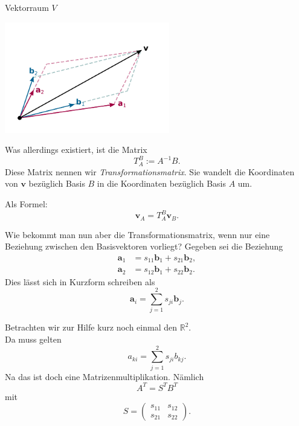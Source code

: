 \documentclass[9pt]{beamer}
\newcommand{\bv}[1]{\mathbf{#1}}
\newcommand{\R}{\mathbb R}
\begin{document}
\begin{frame}
\begin{center}Vektorraum $V$\end{center}

\vspace{-2em}
\begin{center}
\includegraphics[width=72mm]{img/Abstrakt-in-Basis-BA.pdf}
\end{center}
\end{frame}

\begin{frame}
Was allerdings existiert, ist die Matrix
\[T_A^B := A^{-1}B.\]\pause
Diese Matrix nennen wir \emph{Transformationsmatrix}. Sie wandelt die
Koordinaten von $\bv v$ bezüglich Basis $B$ in die Koordinaten
bezüglich Basis $A$ um.\pause

\vspace{0.8em}
Als Formel:
\[\bv v_A = T_A^B \bv v_B.\]
\end{frame}

\begin{frame}
Wie bekommt man nun aber die Transformationsmatrix, wenn nur
eine Beziehung zwischen den Basisvektoren vorliegt? Gegeben sei
die Beziehung
\begin{align*}
\bv a_1 &= s_{11}\bv b_1 + s_{21}\bv b_2,\\
\bv a_2 &= s_{12}\bv b_1 + s_{22}\bv b_2.
\end{align*}\pause
Dies lässt sich in Kurzform schreiben als
\[\bv a_i = \sum_{j=1}^2 s_{ji}\bv b_j.\]
\end{frame}

\begin{frame}
Betrachten wir zur Hilfe kurz noch einmal den $\R^2$.\\
Da muss gelten
\[a_{ki} = \sum_{j=1}^2 s_{ji}b_{kj}.\]\pause
Na das ist doch eine Matrizenmultiplikation. Nämlich
\[A^T = S^T B^T\]
mit
\[S = \begin{pmatrix}s_{11} & s_{12}\\
s_{21} & s_{22}\end{pmatrix}.\]
\end{frame}
\end{document}
